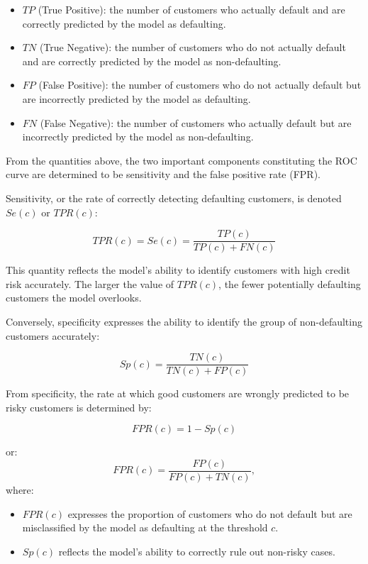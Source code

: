 \begin{itemize}
    \item $TP$ (True Positive): the number of customers who actually default and are correctly predicted by the model as defaulting.
    \item $TN$ (True Negative): the number of customers who do not actually default and are correctly predicted by the model as non-defaulting.
    \item $FP$ (False Positive): the number of customers who do not actually default but are incorrectly predicted by the model as defaulting.
    \item $FN$ (False Negative): the number of customers who actually default but are incorrectly predicted by the model as non-defaulting.
\end{itemize}

\vspace{1em}
From the quantities above, the two important components constituting the ROC curve are determined to be sensitivity and the false positive rate (FPR).

\vspace{1em}
Sensitivity, or the rate of correctly detecting defaulting customers, is denoted $Se(c)$ or $TPR(c)$:

\begin{equation}
    TPR(c)=Se(c)=\frac{TP(c)}{TP(c)+FN(c)}
\end{equation}

This quantity reflects the model's ability to identify customers with high credit risk accurately. The larger the value of $TPR(c)$, the fewer potentially defaulting customers the model overlooks.

\vspace{1em}
Conversely, specificity expresses the ability to identify the group of non-defaulting customers accurately:

\begin{equation}
    Sp(c)=\frac{TN(c)}{TN(c)+FP(c)}
\end{equation}

From specificity, the rate at which good customers are wrongly predicted to be risky customers is determined by:

\begin{equation}
    FPR(c)=1-Sp(c)
\end{equation}

or:
\begin{equation}
    FPR(c)=\frac{FP(c)}{FP(c)+TN(c)},
\end{equation}
where:
\begin{itemize}
    \item $FPR(c)$ expresses the proportion of customers who do not default but are misclassified by the model as defaulting at the threshold $c$.
    \item $Sp(c)$ reflects the model's ability to correctly rule out non-risky cases.
\end{itemize}

